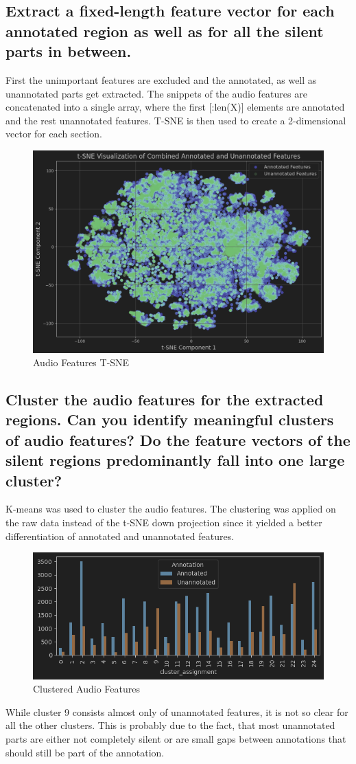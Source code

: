 \subsection{Extract a fixed-length feature vector for each annotated region as well as for all the silent parts in
between. }
\label{sec:Audio Features:b}

First the unimportant features are excluded and the annotated, as well as unannotated parts get extracted.
The snippets of the audio features are concatenated into a single array, where the first [:len(X)] elements are annotated and the rest unannotated features. T-SNE is then used to create a 2-dimensional vector for each section.

\newpage

\begin{figure}[htbp]
    \centering
    \includegraphics[width=0.5\linewidth]{figs/Audio Features T-SNE.png}
    \caption{Audio Features T-SNE}
    \label{fig:Audio Features T-SNE}
\end{figure}


\subsection{Cluster the audio features for the extracted regions. Can you identify meaningful clusters of audio
features? Do the feature vectors of the silent regions predominantly fall into one large cluster?}
\label{sec:Audio Features:c}

K-means was used to cluster the audio features. The clustering was applied on the raw data instead of the t-SNE down projection since it yielded a better differentiation of annotated and unannotated features.

\begin{figure}[htbp]
    \centering
    \includegraphics[width=0.5\linewidth]{figs/Clustered Audio Features.png}
    \caption{Clustered Audio Features}
    \label{fig:Clustered Audio Features}
\end{figure}
While cluster 9 consists almost only of unannotated features, it is not so clear for all the other clusters. This is probably due to the fact, that most unannotated parts are either not completely silent or are small gaps between annotations that should still be part of the annotation.

